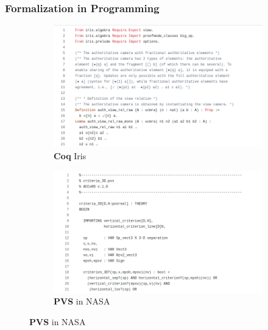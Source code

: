 \documentclass{beamer}
\theoremstyle{definition}
\theoremstyle{remark}
\begin{document}
\begin{frame}
	\frametitle{Formalization in Programming}
	\begin{figure}
		\centering
		\begin{subfigure}[b]{0.45\textwidth}
						\includegraphics[width=\textwidth]{iris.png}
						\caption{\tiny \textbf{Coq} Iris}
		\end{subfigure}
		\hspace{0.5cm}
		\begin{subfigure}[b]{0.45\textwidth}
						\includegraphics[width=\textwidth]{pvs.png}
						\caption{\tiny \textbf{PVS} in NASA}
		\end{subfigure}


\end{figure}
\end{frame}
\end{document}
